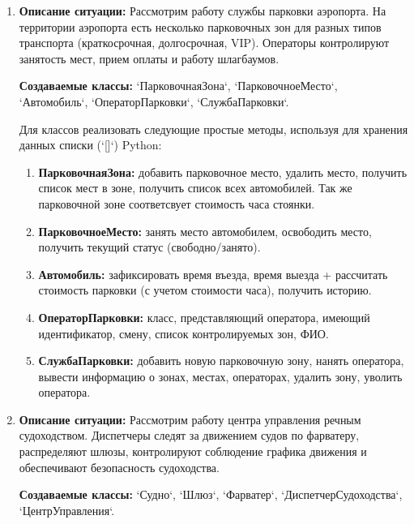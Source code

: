 \begin{enumerate}
\item \textbf{Описание ситуации:} Рассмотрим работу службы парковки аэропорта. 
На территории аэропорта есть несколько парковочных зон для разных типов 
транспорта (краткосрочная, долгосрочная, VIP). 
Операторы контролируют занятость мест, прием оплаты и работу шлагбаумов.

\textbf{Создаваемые классы:} `ПарковочнаяЗона`, `ПарковочноеМесто`, `Автомобиль`, `ОператорПарковки`, `СлужбаПарковки`.

Для классов реализовать следующие простые методы, используя для хранения данных списки (`[]`) Python:
\begin{enumerate}
    \item \textbf{ПарковочнаяЗона:} добавить парковочное место, 
    удалить место, получить список мест в зоне, получить список всех автомобилей. Так же парковочной зоне 
    соответсвует стоимость часа стоянки.
    \item \textbf{ПарковочноеМесто:} занять место автомобилем, 
    освободить место, получить текущий статус (свободно/занято).
    \item \textbf{Автомобиль:} зафиксировать время въезда, время выезда + 
    рассчитать стоимость парковки (с учетом стоимости часа), получить историю.
    \item \textbf{ОператорПарковки:} класс, представляющий оператора, 
    имеющий идентификатор, смену, список контролируемых зон, ФИО.
    \item \textbf{СлужбаПарковки:} добавить новую парковочную зону, 
    нанять оператора, вывести информацию о зонах, местах, операторах, удалить зону, уволить оператора.
\end{enumerate}

\item \textbf{Описание ситуации:} Рассмотрим работу центра управления речным судоходством. 
Диспетчеры следят за движением судов по фарватеру, 
распределяют шлюзы, контролируют соблюдение графика движения 
и обеспечивают безопасность судоходства.

\textbf{Создаваемые классы:} `Судно`, `Шлюз`, `Фарватер`, `ДиспетчерСудоходства`, `ЦентрУправления`.


\end{enumerate}

